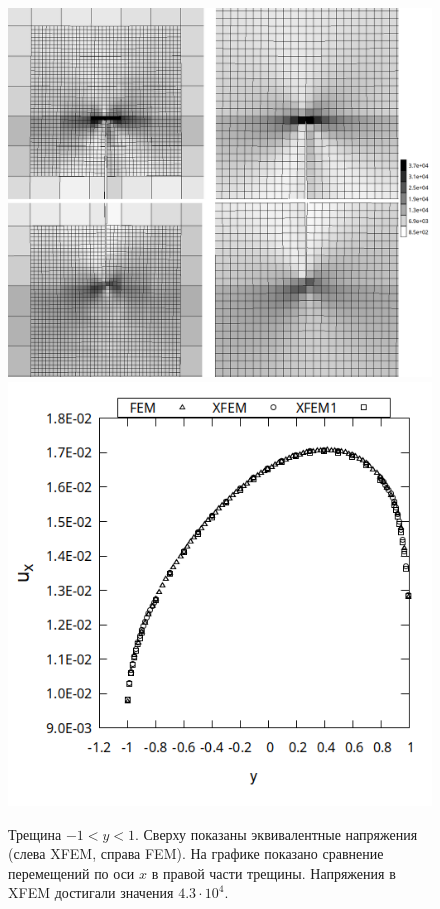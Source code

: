 \begin{figure}[h!]
	\includegraphics[height=0.4\textheight]{pictures/1.0_top_bot}
	\includegraphics[height=0.4\textheight]{pictures/1.0_ux}
	\caption{ Трещина $-1<y<1$. Сверху показаны эквивалентные напряжения (слева XFEM, справа FEM). На графике показано сравнение перемещений по оси $x$ в правой части трещины. Напряжения в XFEM достигали значения $4.3\cdot 10^{4}$.
	}
	\label{fig:res2}
\end{figure}
